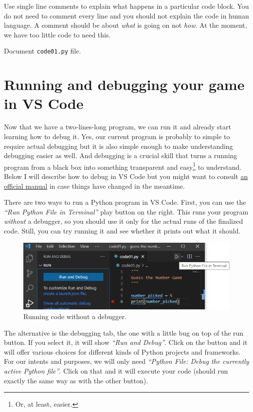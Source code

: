 \documentclass[
]{book}
\begin{document}
Use single line comments to explain what happens in a particular code block. You do not need to comment every line and you should not explain the code in human language. A comment should be about \emph{what} is going on not \emph{how}. At the moment, we have too little code to need this.

Document \texttt{code01.py} file.

\hypertarget{debugging}{%
\section{Running and debugging your game in VS Code}\label{debugging}}

Now that we have a two-lines-long program, we can run it and already start learning how to debug it. Yes, our current program is probably to simple to require actual debugging but it is also simple enough to make understanding debugging easier as well. And debugging is a crucial skill that turns a running program from a black box into something transparent and easy\footnote{Or, at least, easier.} to understand. Below I will describe how to debug in VS Code but you might want to consult \href{https://code.visualstudio.com/docs/python/debugging}{an official manual} in case things have changed in the meantime.

There are two ways to run a Python program in VS Code. First, you can use the \emph{``Run Python File in Terminal''} play button on the right. This runs your program \emph{without} a debugger, so you should use it only for the actual runs of the finalized code. Still, you can try running it and see whether it prints out what it should.

\begin{figure}
\centering
\includegraphics{images/debug-vs-run.png}
\caption{Running code without a debugger.}
\end{figure}

The alternative is the debugging tab, the one with a little bug on top of the run button. If you select it, it will show \emph{``Run and Debug''}. Click on the button and it will offer various choices for different kinds of Python projects and frameworks. For our intents and purposes, we will only need \emph{``Python File: Debug the currently active Python file''}. Click on that and it will execute your code (should run exactly the same way as with the other button).
\end{document}
